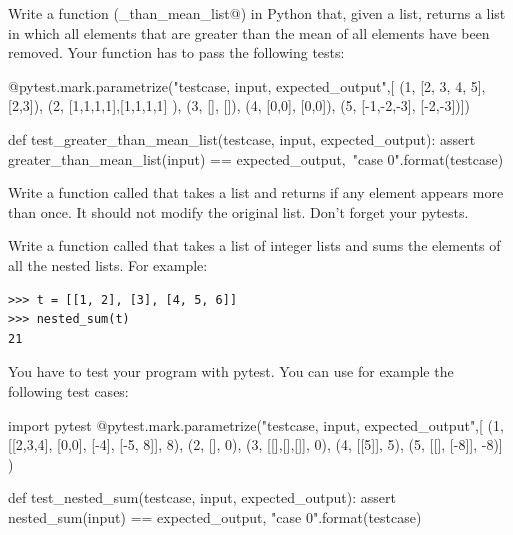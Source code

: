 \begin{exercise} 
Write a function (\verb@greater_than_mean_list@) in Python that, given a list, returns a list in which all elements that are greater than the mean of all elements have been removed. Your function has to pass the following tests:

\begin{small}
\begin{python}
@pytest.mark.parametrize("testcase, input, expected_output",[
(1, [2, 3, 4, 5], [2,3]),   
(2, [1,1,1,1],[1,1,1,1] ),              
(3, [], []),
(4, [0,0], [0,0]),
(5, [-1,-2,-3], [-2,-3])])              

def test_greater_than_mean_list(testcase, input, expected_output):
    assert greater_than_mean_list(input) == expected_output,\
           "case {0}".format(testcase)
\end{python}
\end{small}

\end{exercise}

\begin{exercise}
\label{duplicate}

Write a function called  that takes a list and returns  if any element appears more than once. It should not modify the original list. Don't forget your pytests.


\end{exercise}




\begin{exercise}

Write a function called \pythoninline{nested_sum} that takes a list of integer lists and sums the elements of all the nested lists. For example:

\begin{Verbatim}[frame=single]
>>> t = [[1, 2], [3], [4, 5, 6]]
>>> nested_sum(t)
21
\end{Verbatim}

You have to test your program with pytest. You can use for example the following test cases:

\begin{python}
import pytest
@pytest.mark.parametrize("testcase, input, expected_output",[
(1, [[2,3,4], [0,0], [-4], [-5, 8]], 8),   
(2, [], 0),              
(3, [[],[],[]], 0),
(4, [[5]], 5),
(5, [[], [-8]], -8)]
)              

def test_nested_sum(testcase, input, expected_output):
    assert nested_sum(input) == expected_output, "case {0}".format(testcase)
\end{python}


\end{exercise}

